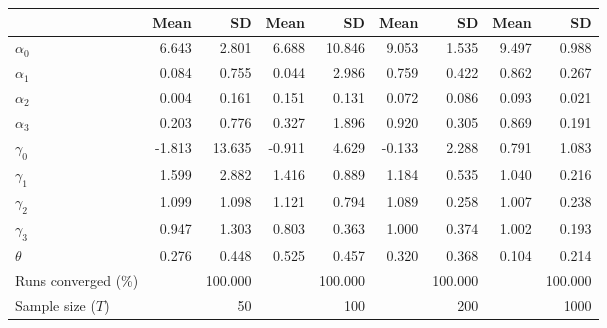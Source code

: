 
\begin{tabular}[t]{lrrrrrrrr}
\toprule
  & Mean & SD & Mean  & SD  & Mean   & SD   & Mean    & SD   \\
\midrule
$\alpha_{0}$ & 6.643 & 2.801 & 6.688 & 10.846 & 9.053 & 1.535 & 9.497 & 0.988\\
$\alpha_{1}$ & 0.084 & 0.755 & 0.044 & 2.986 & 0.759 & 0.422 & 0.862 & 0.267\\
$\alpha_{2}$ & 0.004 & 0.161 & 0.151 & 0.131 & 0.072 & 0.086 & 0.093 & 0.021\\
$\alpha_{3}$ & 0.203 & 0.776 & 0.327 & 1.896 & 0.920 & 0.305 & 0.869 & 0.191\\
$\gamma_{0}$ & -1.813 & 13.635 & -0.911 & 4.629 & -0.133 & 2.288 & 0.791 & 1.083\\
$\gamma_{1}$ & 1.599 & 2.882 & 1.416 & 0.889 & 1.184 & 0.535 & 1.040 & 0.216\\
$\gamma_{2}$ & 1.099 & 1.098 & 1.121 & 0.794 & 1.089 & 0.258 & 1.007 & 0.238\\
$\gamma_{3}$ & 0.947 & 1.303 & 0.803 & 0.363 & 1.000 & 0.374 & 1.002 & 0.193\\
$\theta$ & 0.276 & 0.448 & 0.525 & 0.457 & 0.320 & 0.368 & 0.104 & 0.214\\
Runs converged (\%) &  & 100.000 &  & 100.000 &  & 100.000 &  & 100.000\\
Sample size ($T$) &  & 50 &  & 100 &  & 200 &  & 1000\\
\bottomrule
\end{tabular}
